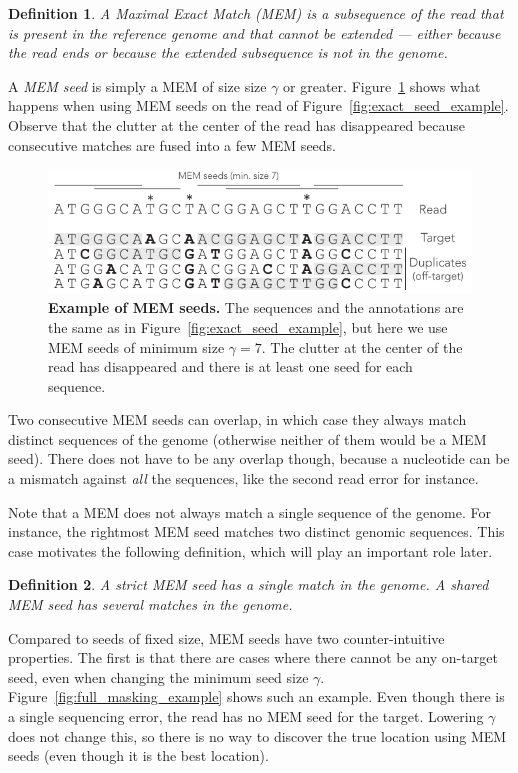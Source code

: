 \documentclass{article}
\newtheorem{definition}{Definition}
\begin{document}
\begin{definition}
A Maximal Exact Match (MEM) is a subsequence of the read that is present
in the reference genome and that cannot be extended --- either because the
read ends or because the extended subsequence is not in the genome.
\end{definition}

A \emph{MEM seed} is simply a MEM of size size $\gamma$ or greater.
Figure~\ref{fig:MEM_example} shows what happens when using MEM seeds on the
read of Figure~\ref{fig:exact_seed_example}. Observe that the clutter at the
center of the read has disappeared because consecutive matches are fused
into a few MEM seeds.

\begin{figure}[h]
\centering
\includegraphics[scale=1]{MEM_example.pdf}
\caption{\textbf{Example of MEM seeds.}
The sequences and the annotations are the same as in
Figure~\ref{fig:exact_seed_example}, but here we use MEM seeds of minimum
size $\gamma=7$. The clutter at the center of the read has disappeared and
there is at least one seed for each sequence.}
\label{fig:MEM_example}
\end{figure}

Two consecutive MEM seeds can overlap, in which case they always match
distinct sequences of the genome (otherwise neither of them would be a MEM
seed). There does not have to be any overlap though, because a nucleotide
can be a mismatch against \emph{all} the sequences, like the second read
error for instance.

Note that a MEM does not always match a single sequence of the genome. For
instance, the rightmost MEM seed matches two distinct genomic sequences.
This case motivates the following definition, which will play an important
role later.

\begin{definition}
A \emph{strict} MEM seed has a single match in the genome.
A \emph{shared} MEM seed has several matches in the genome.
\end{definition}

Compared to seeds of fixed size, MEM seeds have two counter-intuitive
properties. The first is that there are cases where there cannot be any
on-target seed, even when changing the minimum seed size $\gamma$.
Figure~\ref{fig:full_masking_example} shows such an example. Even though
there is a single sequencing error, the read has no MEM seed for the
target. Lowering $\gamma$ does not change this, so there is no way to
discover the true location using MEM seeds (even though it is the best
location).
\end{document}
